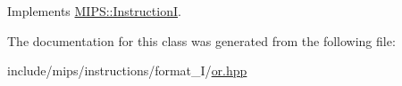Implements \hyperlink{classMIPS_1_1InstructionI_ae60fca5801bf5415cdff06d2aa11764f}{M\+I\+P\+S\+::\+InstructionI}.



The documentation for this class was generated from the following file\+:\begin{DoxyCompactItemize}
\item 
include/mips/instructions/format\+\_\+\+I/\hyperlink{or_8hpp}{or.\+hpp}\end{DoxyCompactItemize}
